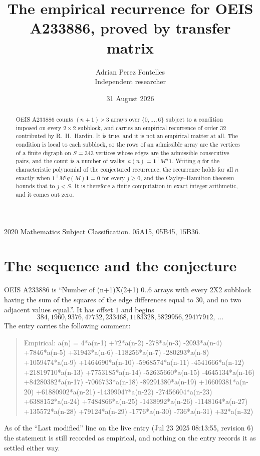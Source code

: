 \documentclass[11pt,a4paper]{article}
\title{The empirical recurrence for OEIS A233886, proved by transfer matrix}
\author{Adrian Perez Fontelles\\ \small Independent researcher}
\date{31 August 2026}
\theoremstyle{plain}
\theoremstyle{definition}
\begin{document}
\maketitle

\begin{abstract}
OEIS A233886 counts $(n+1)\times3$ arrays over $\{0,\dots,6\}$ subject to a condition imposed on
every $2\times2$ subblock, and carries an empirical recurrence of order $32$ contributed
by R.~H.~Hardin. It is true, and it is not an empirical matter at all. The condition is local
to each subblock, so the rows of an admissible array are the vertices of a finite digraph
on $S=343$ vertices whose edges are the admissible consecutive pairs, and the count is a
number of walks: $a(n)=\mathbf{1}^{\!\top}M^{n}\mathbf{1}$. Writing $q$
for the characteristic polynomial of the conjectured recurrence, the recurrence holds for all
$n$ exactly when $\mathbf{1}^{\!\top}M^{j}q(M)\mathbf{1}=0$ for every $j\ge0$, and the
Cayley--Hamilton theorem bounds that to $j<S$. It is therefore a finite computation in exact
integer arithmetic, and it comes out zero.
\end{abstract}

\noindent\small 2020 Mathematics Subject Classification. 05A15, 05B45, 15B36.\normalsize

\section{The sequence and the conjecture}

OEIS A233886 is ``Number of (n+1)X(2+1) 0..6 arrays with every 2X2 subblock having the sum of the squares of the edge differences equal to 30, and no two adjacent values equal.''. It has offset $1$ and begins
\[
384, 1960, 9376, 47732, 233468, 1183328, 5829956, 29477912,\ \dots
\]
The entry carries the following comment:
\begin{quote}\small
Empirical: a(n) = 4*a(n-1) +72*a(n-2) -278*a(n-3) -2093*a(n-4) +7846*a(n-5) +31943*a(n-6) -118256*a(n-7) -280293*a(n-8) +1059474*a(n-9) +1464690*a(n-10) -5968574*a(n-11) -4541666*a(n-12) +21819710*a(n-13) +7753185*a(n-14) -52635660*a(n-15) -4645134*a(n-16) +84280382*a(n-17) -7066733*a(n-18) -89291380*a(n-19) +16609381*a(n-20) +61880902*a(n-21) -14399047*a(n-22) -27456604*a(n-23) +6388152*a(n-24) +7484866*a(n-25) -1438992*a(n-26) -1148164*a(n-27) +135572*a(n-28) +79124*a(n-29) -1776*a(n-30) -736*a(n-31) +32*a(n-32)
\end{quote}
As of the ``Last modified'' line on the live entry (Jul 23 2025 08:13:55, revision 6) the statement is
still recorded as empirical, and nothing on the entry records it as settled either way.
\end{document}
